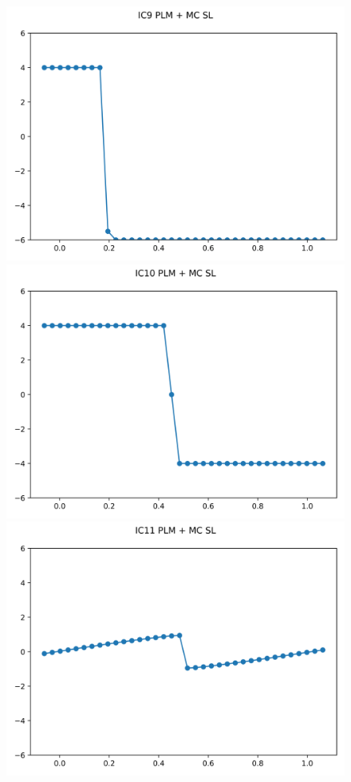\documentclass{article}
\begin{document}
\begin{figure}[t]
        \includegraphics[width=.95\textwidth]{../../code/IC9Methodpo_plot.png}
        \includegraphics[width=.95\textwidth]{../../code/IC10Methodpo_plot.png}
        \includegraphics[width=.95\textwidth]{../../code/IC11Methodpo_plot.png}

\end{figure}
\end{document}
